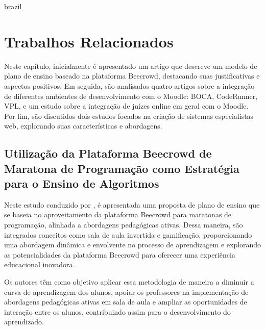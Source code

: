 

\begin{otherlanguage*}{brazil}

\chapter{Trabalhos Relacionados}

Neste capítulo, inicialmente é apresentado um artigo que descreve um modelo de plano de ensino baseado na plataforma Beecrowd, destacando suas justificativas e aspectos positivos. Em seguida, são analisados quatro artigos sobre a integração de diferentes ambientes de desenvolvimento com o Moodle: BOCA, CodeRunner, VPL, e um estudo sobre a integração de juízes online em geral com o Moodle. Por fim, são discutidos dois estudos focados na criação de sistemas especialistas web, explorando suas características e abordagens.

\section{Utilização da Plataforma Beecrowd de Maratona de Programação como Estratégia para o Ensino de Algoritmos}

Neste estudo conduzido por \cite{cruz2022}, é apresentada uma proposta de plano de ensino que se baseia no aproveitamento da plataforma Beecrowd para maratonas de programação, alinhada a abordagens pedagógicas ativas. Dessa maneira, são integrados conceitos como sala de aula invertida e gamificação, proporcionando uma abordagem dinâmica e envolvente no processo de aprendizagem e explorando as potencialidades da plataforma Beecrowd para oferecer uma experiência educacional inovadora. 

Os autores têm como objetivo aplicar essa metodologia de maneira a diminuir a curva de aprendizagem dos alunos, apoiar os professores na implementação de abordagens pedagógicas ativas em sala de aula e ampliar as oportunidades de interação entre os alunos, contribuindo assim para o desenvolvimento do aprendizado.


\end{otherlanguage*}
